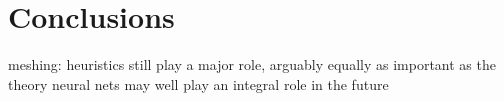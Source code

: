 \chapter{Conclusions}
\label{chap:7}
%

meshing:
heuristics still play a major role, arguably equally as important as the theory
neural nets may well play an integral role in the future
